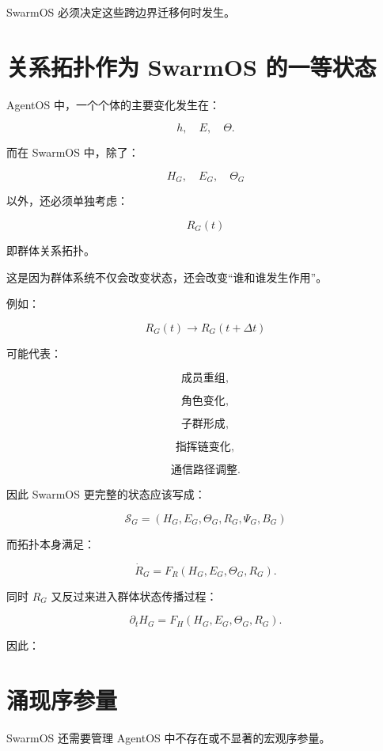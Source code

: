 SwarmOS 必须决定这些跨边界迁移何时发生。


\section{关系拓扑作为 SwarmOS 的一等状态}

AgentOS 中，一个个体的主要变化发生在：

\[
h,
\quad
E,
\quad
\Theta.
\]

而在 SwarmOS 中，除了：

\[
H_G,
\quad
E_G,
\quad
\Theta_G
\]

以外，还必须单独考虑：

\[
\boxed{
R_G(t)
}
\]

即群体关系拓扑。

这是因为群体系统不仅会改变状态，还会改变``谁和谁发生作用''。

例如：

\[
R_G(t)
\rightarrow
R_G(t+\Delta t)
\]

可能代表：

\[
\text{成员重组},
\]

\[
\text{角色变化},
\]

\[
\text{子群形成},
\]

\[
\text{指挥链变化},
\]

\[
\text{通信路径调整}.
\]

因此 SwarmOS 更完整的状态应该写成：

\[
\boxed{
\mathcal{S}_G
=
\left(
H_G,
E_G,
\Theta_G,
R_G,
\Psi_G,
B_G
\right)
}
\]

而拓扑本身满足：

\[
\dot R_G
=
F_R
\left(
H_G,
E_G,
\Theta_G,
R_G
\right).
\]

同时 $R_G$ 又反过来进入群体状态传播过程：

\[
\partial_tH_G
=
F_H
\left(
H_G,
E_G,
\Theta_G,
R_G
\right).
\]

因此：

\begin{statementbox}
\centering
{}
\end{statementbox}


\section{涌现序参量}

SwarmOS 还需要管理 AgentOS 中不存在或不显著的宏观序参量。

